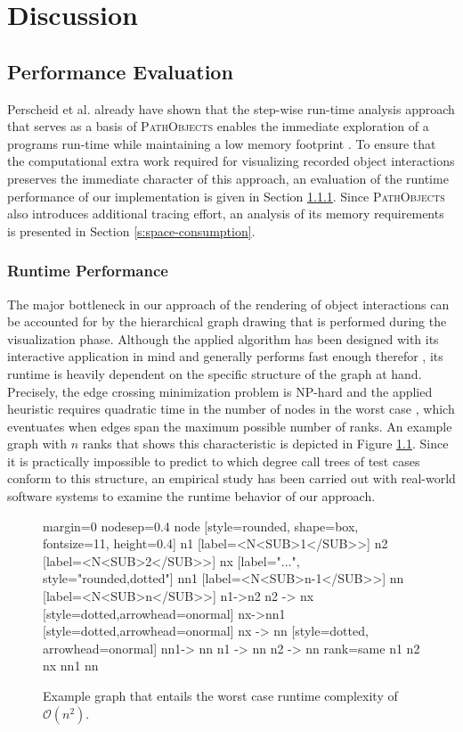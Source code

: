 \chapter{Discussion}
\label{c:discussion}

\section{Performance Evaluation}
Perscheid et al. already have shown that the step-wise run-time analysis approach that serves as a basis of \textsc{PathObjects} enables the immediate exploration of a programs run-time while maintaining a low memory footprint  \cite{perscheid_immediacy_2010}.
To ensure that the computational extra work required for visualizing recorded object interactions preserves the immediate character of this approach, an evaluation of the runtime performance of our implementation is given in Section \ref{s:runtime-performance}.
Since \textsc{PathObjects} also introduces additional tracing effort, an analysis of its memory requirements is presented in Section \ref{s:space-consumption}.

\subsection{Runtime Performance}
\label{s:runtime-performance}
The major bottleneck in our approach of the rendering of object interactions can be accounted for by the hierarchical graph drawing that is performed during the visualization phase.
Although the applied algorithm has been designed with its interactive application in mind and generally performs fast enough therefor \cite{gansner_technique_1993}, its runtime is heavily dependent on the specific structure of the graph at hand.
Precisely, the edge crossing minimization problem is NP-hard and the applied heuristic requires quadratic time in the number of nodes in the worst case \cite{tamassia_handbook_2013}, which eventuates when edges span the maximum possible number of ranks.
An example graph with $n$ ranks that shows this characteristic is depicted in Figure \ref{fig:graph-worst-case}.
Since it is practically impossible to predict to which degree call trees of test cases conform to this structure, an empirical study has been carried out with real-world software systems to examine the runtime behavior of our approach.

\begin{figure}[tb]
	\centering	
	{
		margin=0
		nodesep=0.4
		node [style=rounded, shape=box, fontsize=11, height=0.4]
		n1 [label=<N<SUB>1</SUB>>]
		n2 [label=<N<SUB>2</SUB>>]
		nx [label="...", style="rounded,dotted"]
		nn1 [label=<N<SUB>n-1</SUB>>]
		nn [label=<N<SUB>n</SUB>>]
		n1->n2
		n2 -> nx [style=dotted,arrowhead=onormal]
		nx->nn1 [style=dotted,arrowhead=onormal]
		nx -> nn [style=dotted, arrowhead=onormal]
		nn1-> nn
		n1 -> nn
		n2 -> nn
		{rank=same n1 n2 nx nn1 nn}
	}
	\caption{Example graph that entails the worst case runtime complexity of $\mathcal O(n^2)$.}
	\label{fig:graph-worst-case}
\end{figure}

